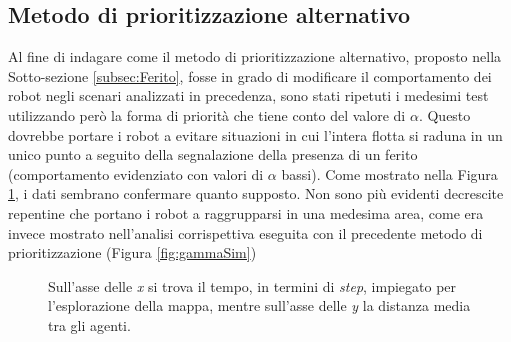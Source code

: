 \subsection{Metodo di prioritizzazione alternativo}
Al fine di indagare come il metodo di prioritizzazione alternativo, proposto nella Sotto-sezione \ref{subsec:Ferito}, fosse in grado di modificare il comportamento dei robot negli scenari analizzati in precedenza, sono stati ripetuti i medesimi test utilizzando però la forma di priorità che tiene conto del valore di $\alpha$. Questo dovrebbe portare i robot a evitare situazioni in cui l'intera flotta si raduna in un unico punto a seguito della segnalazione della presenza di un ferito (comportamento evidenziato con valori di $\alpha$ bassi).
Come mostrato nella Figura \ref{fig:NgammaLDistr}, i dati sembrano confermare quanto supposto. Non sono più evidenti decrescite repentine che portano i robot a raggrupparsi in una medesima area, come era invece mostrato nell'analisi corrispettiva eseguita con il precedente metodo di prioritizzazione (Figura \ref{fig:gammaSim})
\begin{figure}
	\hfill
	\caption{Sull'asse delle \textit{x} si trova il tempo, in termini di \textit{step}, impiegato per l'esplorazione della mappa, mentre sull'asse delle \textit{y} la distanza media tra gli agenti.}
	\label{fig:NgammaLDistr}
\end{figure}
